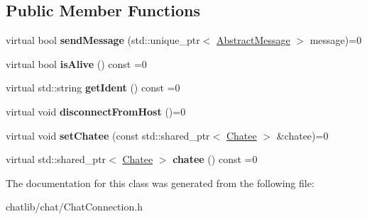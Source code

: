 \subsection*{Public Member Functions}
\begin{DoxyCompactItemize}
\item 
\hypertarget{classSimpleChat_1_1ChatConnection_af5672f1d6c37c218e777fb7622c349a1}{virtual bool {\bfseries send\-Message} (std\-::unique\-\_\-ptr$<$ \hyperlink{classSimpleChat_1_1AbstractMessage}{Abstract\-Message} $>$ message)=0}\label{classSimpleChat_1_1ChatConnection_af5672f1d6c37c218e777fb7622c349a1}

\item 
\hypertarget{classSimpleChat_1_1ChatConnection_aa9b5995be550f047cc626655774dd8d4}{virtual bool {\bfseries is\-Alive} () const =0}\label{classSimpleChat_1_1ChatConnection_aa9b5995be550f047cc626655774dd8d4}

\item 
\hypertarget{classSimpleChat_1_1ChatConnection_ae054c601d19454d04501d386b17c9d86}{virtual std\-::string {\bfseries get\-Ident} () const =0}\label{classSimpleChat_1_1ChatConnection_ae054c601d19454d04501d386b17c9d86}

\item 
\hypertarget{classSimpleChat_1_1ChatConnection_a814ba178e2fd884bb4ec8d5dc191257b}{virtual void {\bfseries disconnect\-From\-Host} ()=0}\label{classSimpleChat_1_1ChatConnection_a814ba178e2fd884bb4ec8d5dc191257b}

\item 
\hypertarget{classSimpleChat_1_1ChatConnection_aedb96479d631cfdcd4014a5e242aa302}{virtual void {\bfseries set\-Chatee} (const std\-::shared\-\_\-ptr$<$ \hyperlink{classSimpleChat_1_1Chatee}{Chatee} $>$ \&chatee)=0}\label{classSimpleChat_1_1ChatConnection_aedb96479d631cfdcd4014a5e242aa302}

\item 
\hypertarget{classSimpleChat_1_1ChatConnection_abe39f6641a66d0a440d66fca649a7357}{virtual std\-::shared\-\_\-ptr$<$ \hyperlink{classSimpleChat_1_1Chatee}{Chatee} $>$ {\bfseries chatee} () const =0}\label{classSimpleChat_1_1ChatConnection_abe39f6641a66d0a440d66fca649a7357}

\end{DoxyCompactItemize}


The documentation for this class was generated from the following file\-:\begin{DoxyCompactItemize}
\item 
chatlib/chat/Chat\-Connection.\-h\end{DoxyCompactItemize}
